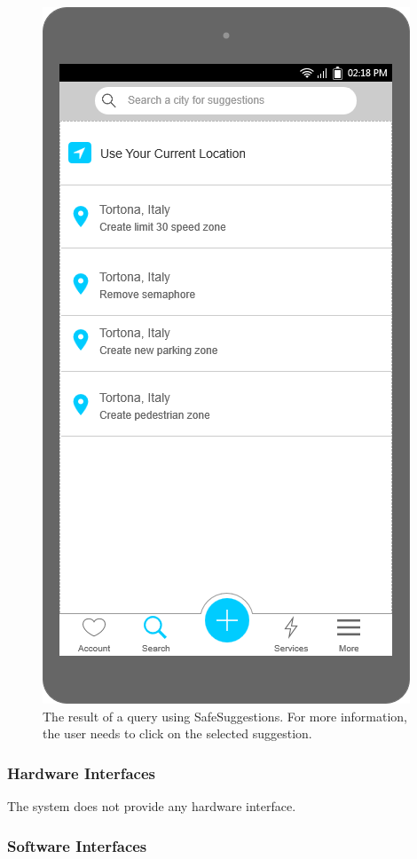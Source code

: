 \documentclass[a4paper]{article}
\newcommand{\mockupheight}{0.4\textheight}
\begin{document}
\begin{figure}[H]
\centering
\includegraphics[height=\mockupheight]{mockup/get_suggestions}
\caption{The result of a query using SafeSuggestions. For more
information, the user needs to click on the selected suggestion.}
\end{figure}

\subsubsection{Hardware Interfaces}

The system does not provide any hardware interface.

\subsubsection{Software Interfaces}
\end{document}

